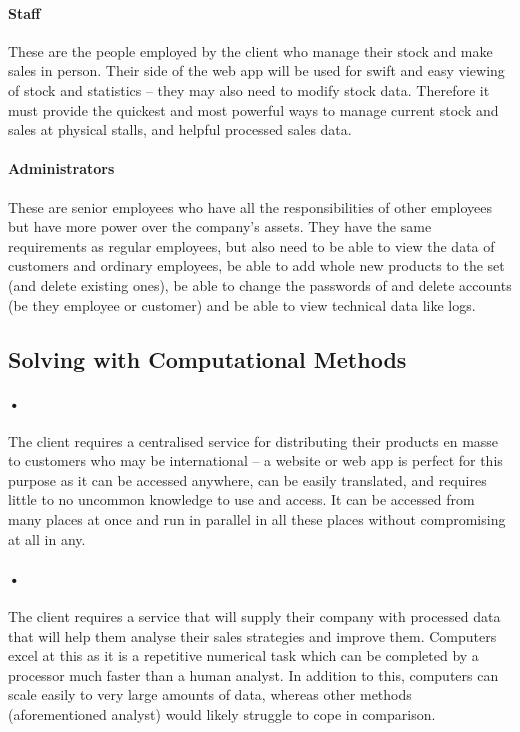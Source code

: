 ﻿\documentclass{article}
\begin{document}
    \paragraph{Staff}
    These are the people employed by the client who manage their stock and make sales in person. 
    Their side of the web app will be used for swift and easy viewing of stock and statistics – they may also need to modify stock data. 
    Therefore it must provide the quickest and most powerful ways to manage current stock and sales at physical stalls, and helpful processed sales data.
    \paragraph{Administrators} 
    These are senior employees who have all the responsibilities of other employees but have more power over the company’s assets. 
    They have the same requirements as regular employees, but also need to be able to view the data of customers and ordinary employees, be able to add whole new products to the set (and delete existing ones), be able to change the passwords of and delete accounts (be they employee or customer) and be able to view technical data like logs.
    
    \subsection{Solving with Computational Methods}
    \paragraph{•}
    The client requires a centralised service for distributing their products en masse to customers who may be international – a website or web app is perfect for this purpose as it can be accessed anywhere, can be easily translated, and requires little to no uncommon knowledge to use and access. 
    It can be accessed from many places at once and run in parallel in all these places without compromising at all in any.
    \paragraph{•}
    The client requires a service that will supply their company with processed data that will help them analyse their sales strategies and improve them. 
    Computers excel at this as it is a repetitive numerical task which can be completed by a processor much faster than a human analyst. 
    In addition to this, computers can scale easily to very large amounts of data, whereas other methods (aforementioned analyst) would likely struggle to cope in comparison.
\end{document}
